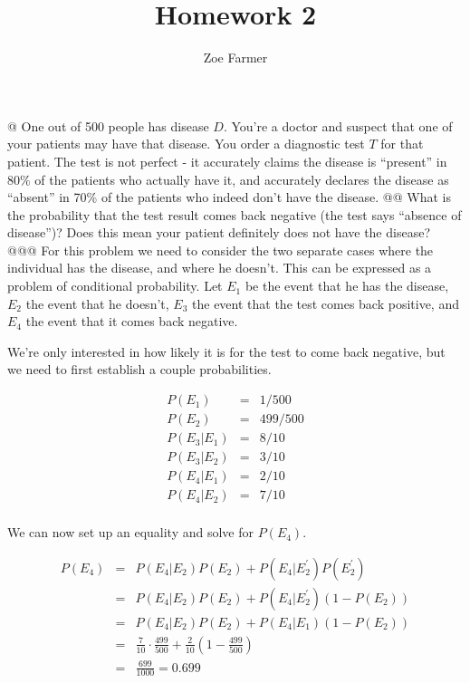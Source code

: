 \documentclass[10pt]{article}
\title{Homework 2}
\author{Zoe Farmer}
\begin{document}
\maketitle

\begin{easylist}[enumerate]
    @ One out of 500 people has disease $D$. You're a doctor and suspect that one of your patients may have that
    disease. You order a diagnostic test $T$ for that patient. The test is not perfect - it accurately claims the
    disease is ``present'' in 80\% of the patients who actually have it, and accurately declares the disease as
    ``absent'' in 70\% of the patients who indeed don't have the disease.
    @@ What is the probability that the test result comes back negative (the test says ``absence of disease'')? Does
    this mean your patient definitely does not have the disease?
    @@@ For this problem we need to consider the two separate cases where the individual has the disease, and where he
    doesn't. This can be expressed as a problem of conditional probability. Let $E_1$ be the event that he has the
    disease, $E_2$ the event that he doesn't, $E_3$ the event that the test comes back positive, and $E_4$ the event
    that it comes back negative.\newline

    We're only interested in how likely it is for the test to come back negative, but we need to first establish a
    couple probabilities.

        \[ \begin{aligned}
            P(E_1) &=& 1/500\\
            P(E_2) &=& 499/500\\
            P(E_3|E_1) &=& 8/10\\
            P(E_3|E_2) &=& 3/10\\
            P(E_4|E_1) &=& 2/10\\
            P(E_4|E_2) &=& 7/10\\
        \end{aligned} \]

    We can now set up an equality and solve for $P(E_4)$.

        \[ \begin{aligned}
            P(E_4) &=& P(E_4|E_2)P(E_2) + P(E_4|E^\prime_2)P(E^\prime_2)\\
                   &=& P(E_4|E_2)P(E_2) + P(E_4|E^\prime_2)(1 - P(E_2))\\
                   &=& P(E_4|E_2)P(E_2) + P(E_4|E_1)(1 - P(E_2))\\
                   &=& \frac{7}{10} \cdot \frac{499}{500} + \frac{2}{10}\left(1 - \frac{499}{500}\right)\\
                   &=& \frac{699}{1000} = \boxed{0.699}
        \end{aligned} \]


\end{easylist}
\end{document}
